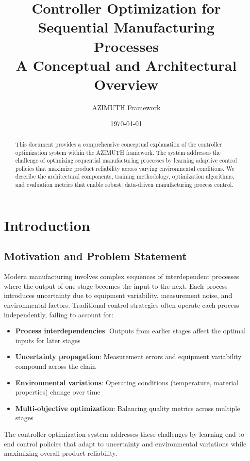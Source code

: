 \documentclass[11pt,a4paper]{article}
\title{\textbf{Controller Optimization for Sequential Manufacturing Processes} \\
\large A Conceptual and Architectural Overview}
\author{AZIMUTH Framework}
\date{\today}
\begin{document}
\maketitle

\begin{abstract}
This document provides a comprehensive conceptual explanation of the controller optimization system within the AZIMUTH framework. The system addresses the challenge of optimizing sequential manufacturing processes by learning adaptive control policies that maximize product reliability across varying environmental conditions. We describe the architectural components, training methodology, optimization algorithms, and evaluation metrics that enable robust, data-driven manufacturing process control.
\end{abstract}

\tableofcontents
\newpage

\section{Introduction}

\subsection{Motivation and Problem Statement}

Modern manufacturing involves complex sequences of interdependent processes where the output of one stage becomes the input to the next. Each process introduces uncertainty due to equipment variability, measurement noise, and environmental factors. Traditional control strategies often operate each process independently, failing to account for:

\begin{itemize}
    \item \textbf{Process interdependencies}: Outputs from earlier stages affect the optimal inputs for later stages
    \item \textbf{Uncertainty propagation}: Measurement errors and equipment variability compound across the chain
    \item \textbf{Environmental variations}: Operating conditions (temperature, material properties) change over time
    \item \textbf{Multi-objective optimization}: Balancing quality metrics across multiple stages
\end{itemize}

The controller optimization system addresses these challenges by learning end-to-end control policies that adapt to uncertainty and environmental variations while maximizing overall product reliability.
\end{document}
